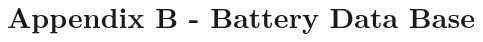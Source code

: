 \chapter*{Appendix B - Battery Data Base}
\label{ap:Celldatabase}


\small
\begin{landscape}
    \setlength\LTleft{-0pt}            %
    \setlength\LTright{0pt}           %
    \setlength{\LTpre}{-10mm}
    \setlength{\LTpost}{-10mm}
    
\end{landscape}
\normalsize